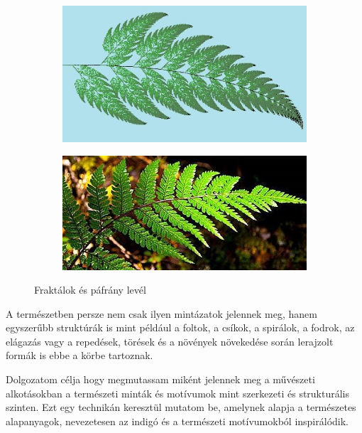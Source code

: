 \documentclass[fontsize=12pt, appendixprefix=true]{scrreprt}
\begin{document}
\begin{figure}[h!]
	\centering
	\begin{subfigure}[b]{0.4\linewidth}
	  \includegraphics[width=\linewidth]{img/fraktal_01.jpg}
	  \caption{}
	\end{subfigure}
	\begin{subfigure}[b]{0.47\linewidth}
	  \includegraphics[width=\linewidth]{img/fraktal_02.jpg}
	  \caption{}
	\end{subfigure}
	\caption{Fraktálok és páfrány levél}
	\label{fig:fraktal}
  \end{figure}

A természetben persze nem csak ilyen mintázatok jelennek meg, hanem egyszerűbb struktúrák is mint például a foltok, a csíkok, a spirálok, a fodrok, az elágazás vagy a repedések, törések és a növények növekedése során lerajzolt formák is ebbe a körbe tartoznak.

Dolgozatom célja hogy megmutassam miként jelennek meg a művészeti alkotásokban a természeti minták és motívumok mint szerkezeti és strukturális szinten. Ezt egy technikán keresztül mutatom be, amelynek alapja a természetes alapanyagok, nevezetesen az indigó és a természeti motívumokból inspirálódik. 
\end{document}
